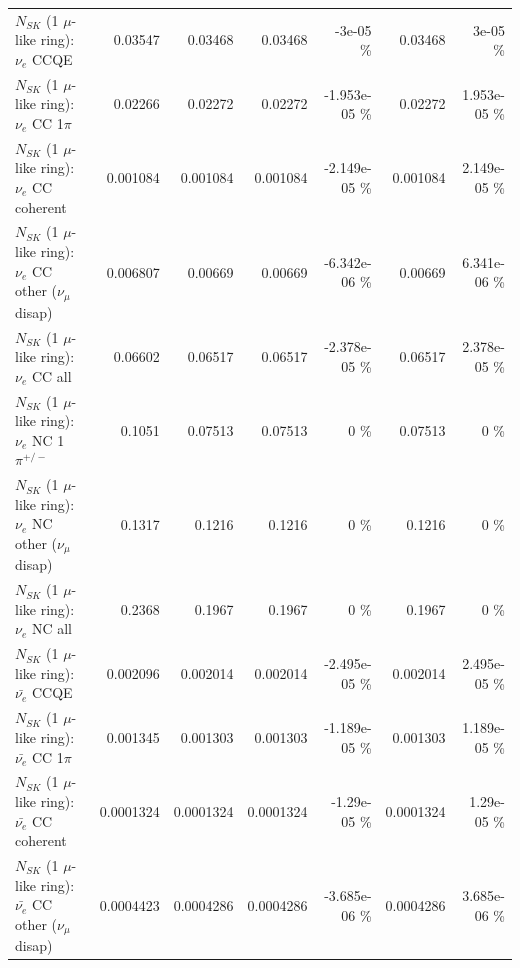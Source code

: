\begin{table}
\begin{tabular}{| l | r | r | r  r | r  r |}
\hline
\hline
\hline
                                      $N_{SK}$ (1 $\mu$-like ring): $\nu_e$ CCQE &         0.03547 &         0.03468 &         0.03468 &   -3e-05 \%  &         0.03468 &    3e-05 \%  \\ 
                                 $N_{SK}$ (1 $\mu$-like ring): $\nu_e$ CC 1$\pi$ &         0.02266 &         0.02272 &         0.02272 & -1.953e-05 \%  &         0.02272 & 1.953e-05 \%  \\ 
                               $N_{SK}$ (1 $\mu$-like ring): $\nu_e$ CC coherent &        0.001084 &        0.001084 &        0.001084 & -2.149e-05 \%  &        0.001084 & 2.149e-05 \%  \\ 
                $N_{SK}$ (1 $\mu$-like ring): $\nu_e$ CC other ($\nu_\mu$ disap) &        0.006807 &         0.00669 &         0.00669 & -6.342e-06 \%  &         0.00669 & 6.341e-06 \%  \\ 
                                  $N_{SK}$ (1 $\mu$-like ring): $\nu_{e}$ CC all &         0.06602 &         0.06517 &         0.06517 & -2.378e-05 \%  &         0.06517 & 2.378e-05 \%  \\ 
\hline
                           $N_{SK}$ (1 $\mu$-like ring): $\nu_e$ NC 1$\pi^{+/-}$ &          0.1051 &         0.07513 &         0.07513 &        0 \%  &         0.07513 &        0 \%  \\ 
                $N_{SK}$ (1 $\mu$-like ring): $\nu_e$ NC other ($\nu_\mu$ disap) &          0.1317 &          0.1216 &          0.1216 &        0 \%  &          0.1216 &        0 \%  \\ 
                                  $N_{SK}$ (1 $\mu$-like ring): $\nu_{e}$ NC all &          0.2368 &          0.1967 &          0.1967 &        0 \%  &          0.1967 &        0 \%  \\ 
\hline
\hline
\hline
                                $N_{SK}$ (1 $\mu$-like ring): $\bar{\nu_e}$ CCQE &        0.002096 &        0.002014 &        0.002014 & -2.495e-05 \%  &        0.002014 & 2.495e-05 \%  \\ 
                           $N_{SK}$ (1 $\mu$-like ring): $\bar{\nu_e}$ CC 1$\pi$ &        0.001345 &        0.001303 &        0.001303 & -1.189e-05 \%  &        0.001303 & 1.189e-05 \%  \\ 
                         $N_{SK}$ (1 $\mu$-like ring): $\bar{\nu_e}$ CC coherent &       0.0001324 &       0.0001324 &       0.0001324 & -1.29e-05 \%  &       0.0001324 & 1.29e-05 \%  \\ 
          $N_{SK}$ (1 $\mu$-like ring): $\bar{\nu_e}$ CC other ($\nu_\mu$ disap) &       0.0004423 &       0.0004286 &       0.0004286 & -3.685e-06 \%  &       0.0004286 & 3.685e-06 \%  \\ 

\end{tabular}
\end{table}
